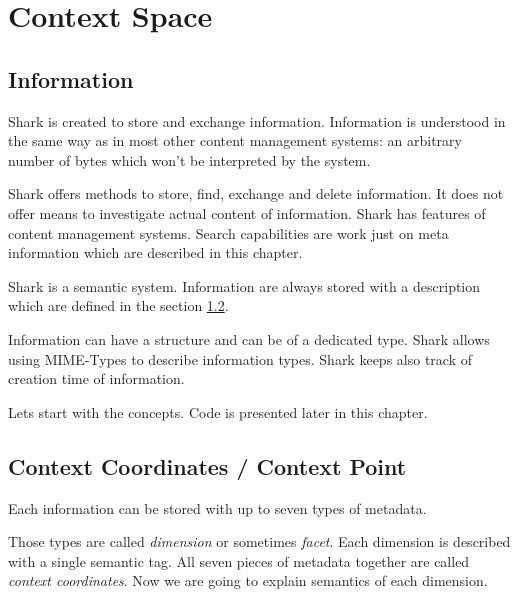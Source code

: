 \chapter{Context Space}
\label{sec:contextspace}
\section{Information}
Shark is created to store and exchange information. Information is understood in the same way as in most other content management systems: an arbitrary number of bytes which won't be interpreted by the system. 

Shark offers methods to store, find, exchange and delete information. It does not offer means to investigate actual content of information. Shark has features of content management systems. Search capabilities are work just on meta information which are described in this chapter.

Shark is a semantic system. Information are always stored with a description which are defined in the section \ref{section:informationcontext}. 

Information can have a structure and can be of a dedicated type. Shark allows using MIME-Types to describe information types. Shark keeps also track of creation time of information.

Lets start with the concepts. Code is presented later in this chapter.

\section{Context Coordinates / Context Point}
\label{section:informationcontext}
Each information can be stored with up to seven types of metadata. 

Those types are called {\it dimension} or sometimes {\it facet}. Each dimension is described with a single semantic tag. All seven pieces of metadata together are called {\it context coordinates}. 
Now we are going to explain semantics of each dimension. 

